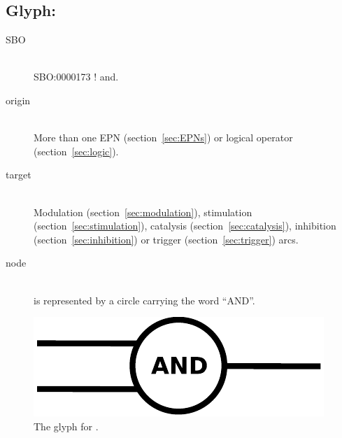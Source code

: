 \subsection{Glyph: }\label{sec:and}

\begin{description}
 \item[SBO]\mbox{}\\ SBO:0000173 ! and.
 \item[origin]\mbox{}\\ More than one EPN (section~\ref{sec:EPNs}) or logical operator (section~\ref{sec:logic}).
 \item[target]\mbox{}\\  Modulation (section~\ref{sec:modulation}), stimulation (section~\ref{sec:stimulation}), catalysis (section~\ref{sec:catalysis}), inhibition (section~\ref{sec:inhibition}) or trigger (section~\ref{sec:trigger}) arcs.
 \item[node]\mbox{}\\  is represented by a circle carrying the word ``AND''.
 \end{description}

\begin{figure}[H]
  \centering
  \includegraphics[scale = 0.5]{images/and}
  \caption{The \PD glyph for .}
  \label{fig:and}
\end{figure}


% 
\normalcolor
